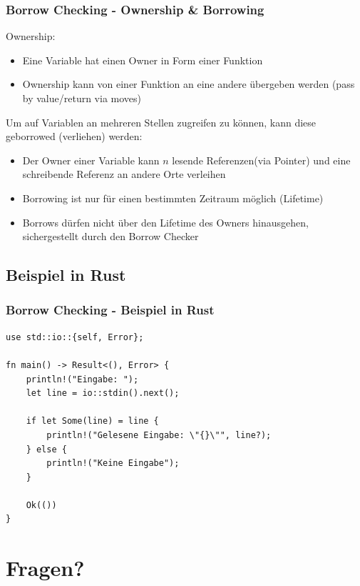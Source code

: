 \documentclass{beamer}
\begin{document}
        \begin{frame}
            \frametitle{Borrow Checking - Ownership \& Borrowing}
            Ownership:
            \begin{itemize}
                \item Eine Variable hat einen Owner in Form einer Funktion
                \item Ownership kann von einer Funktion an eine andere übergeben werden (pass by value/return via moves)
            \end{itemize}
            Um auf Variablen an mehreren Stellen zugreifen zu können, kann diese geborrowed (verliehen) werden:
            \begin{itemize}
                \item Der Owner einer Variable kann $n$ lesende Referenzen(via Pointer) und eine schreibende Referenz an andere Orte verleihen
                \item Borrowing ist nur für einen bestimmten Zeitraum möglich (Lifetime)
                \item Borrows dürfen nicht über den Lifetime des Owners hinausgehen, sichergestellt durch den Borrow Checker
            \end{itemize}
        \end{frame}

        \subsection{Beispiel in Rust}
        \begin{frame}[fragile]
            \frametitle{Borrow Checking - Beispiel in Rust}

            \begin{verbatim}
use std::io::{self, Error};

fn main() -> Result<(), Error> {
    println!("Eingabe: ");
    let line = io::stdin().next();

    if let Some(line) = line {
        println!("Gelesene Eingabe: \"{}\"", line?);
    } else {
        println!("Keine Eingabe");
    }

    Ok(())
}
            \end{verbatim}
        \end{frame}

    \section{Fragen?}
\end{document}
